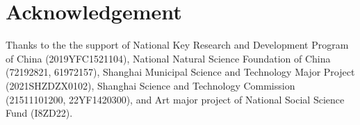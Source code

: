\documentclass{article}
\begin{document}
\section{Acknowledgement}
Thanks to the the support of National Key Research and Development Program of China (2019YFC1521104), National Natural Science Foundation of China (72192821, 61972157), Shanghai Municipal Science and Technology Major Project  (2021SHZDZX0102), Shanghai Science and Technology Commission (21511101200, 22YF1420300), and Art major project of National Social Science Fund (I8ZD22).



\end{document}
